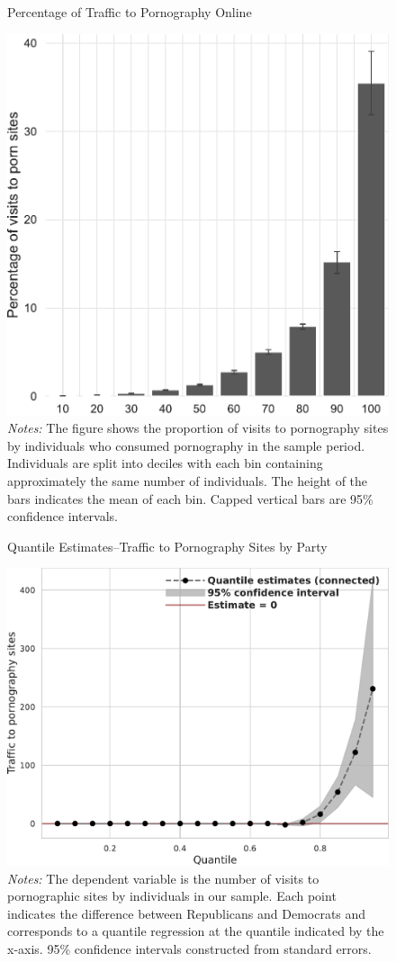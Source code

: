 \documentclass[12pt, letterpaper]{article}
\begin{document}
\begin{figure}
	\centering
	\caption{Percentage of Traffic to Pornography Online}
	\includegraphics[width=.5\linewidth]{figs/distribution_proportion_visits_to_adultsites.pdf}
	\caption*{\footnotesize \emph{Notes:} 
		The figure shows the proportion of visits to pornography sites by individuals who consumed pornography in the sample period.
		Individuals are split into deciles with each bin containing approximately the same number of individuals.
		The height of the bars indicates the mean of each bin.
		Capped vertical bars are 95\% confidence intervals.
	}
	\label{fig:distribution_prop_visits}
\end{figure}

\begin{figure}
	\centering
	\caption{Quantile Estimates--Traffic to Pornography Sites by Party}
	\includegraphics[width=.6\linewidth]{figs/quantile_reg_visits_adult.pdf}
	\caption*{\footnotesize \emph{Notes:} 
		The dependent variable is the number of visits to pornographic sites by individuals in our sample.
		Each point indicates the difference between Republicans and Democrats and corresponds to a quantile regression at the quantile indicated by the x-axis.
		95\% confidence intervals constructed from standard errors.
	}
	\label{fig:quantile_regression_visits}
\end{figure}
\end{document}
